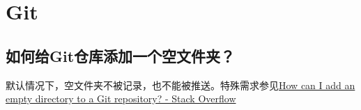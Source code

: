 \chapter{Git}

\section{如何给Git仓库添加一个空文件夹？}
默认情况下，空文件夹不被记录，也不能被推送。特殊需求参见\href{https://stackoverflow.com/questions/115983/how-can-i-add-an-empty-directory-to-a-git-repository}{How can I add an empty directory to a Git repository? - Stack Overflow}

